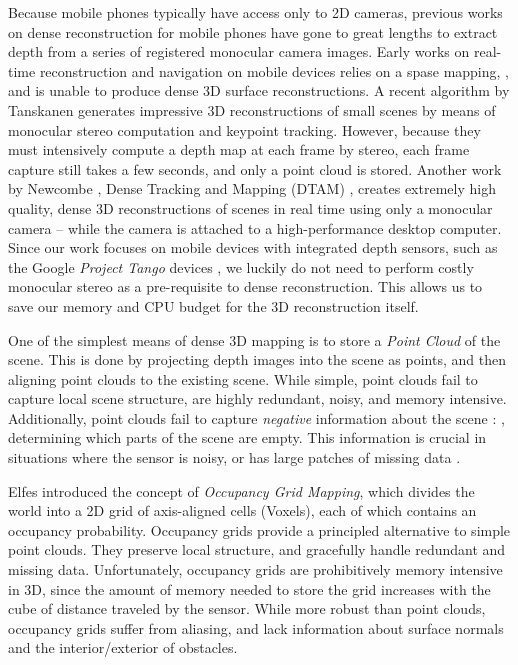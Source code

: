 \documentclass[10pt,twocolumn,letterpaper]{article}
\begin{document}
Because mobile phones typically have access only to 2D cameras, previous works
on dense reconstruction for mobile phones have gone to great lengths to extract
depth from a series of registered monocular camera images.  Early works on
real-time reconstruction and navigation on mobile devices relies on a spase
mapping, \cite{KleinSparse}, and is unable to produce dense 3D surface
reconstructions.  A recent algorithm by Tanskanen \etal
\cite{TanskanenMetric} generates impressive 3D reconstructions of small scenes
by means of monocular stereo computation and keypoint tracking. However,
because they \cite{TanskanenMetric} must intensively compute a depth map at
each frame by stereo, each frame capture still takes a few seconds, and only a
point cloud is stored. Another work by Newcombe \etal, Dense Tracking and
Mapping (DTAM) \cite{DTAM},  creates extremely high quality, dense 3D
reconstructions of scenes in real time using only a monocular camera -- while
the camera is attached to a high-performance desktop computer. Since our work
focuses on mobile devices with integrated depth sensors, such as the Google
\emph{Project Tango} devices \cite{Tango}, we luckily do not need to perform
costly monocular stereo as a pre-requisite to dense reconstruction. This allows
us to save our memory and CPU budget for the 3D reconstruction itself.

One of the simplest means of dense 3D mapping is to  store a \emph{Point
Cloud} of the scene. This is done by projecting depth images into the scene as
points, and then aligning point clouds to the existing scene. While simple,
point clouds fail to capture local scene structure, are highly redundant,
noisy, and memory intensive.  Additionally, point clouds fail to capture
\emph{negative} information about the scene :  \ie, determining which parts of
the scene are empty.  This information is crucial in situations where the
sensor is noisy, or has large patches of missing data \cite{Klingensmith2014}.

Elfes \cite{Elfes1989} introduced the concept of \emph{Occupancy Grid
Mapping}, which divides the world into a 2D grid of axis-aligned cells
(\ie Voxels), each of which contains an occupancy probability. Occupancy
grids provide a principled alternative to simple point clouds. They preserve local
structure, and gracefully handle redundant and missing data.
Unfortunately, occupancy grids are prohibitively memory intensive in 3D, since
the amount of memory needed to store the grid increases with the cube of distance 
traveled by the sensor. While more robust than point clouds, occupancy grids
suffer from aliasing, and lack information about surface normals and the
interior/exterior of obstacles.
\end{document}
